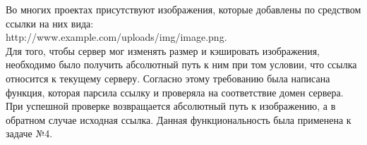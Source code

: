 Во многих проектах присутствуют изображения, которые добавлены по средством ссылки на них вида: \\
http://www.example.com/uploads/img/image.png. \\ Для того, чтобы сервер мог изменять размер и кэшировать изображения, 
необходимо было получить абсолютный путь к ним при том условии, что ссылка относится к текущему серверу. Согласно 
этому требованию была написана функция, которая парсила ссылку и проверяла на соответствие домен сервера. При 
успешной проверке возвращается абсолютный путь к изображению, а в обратном случае исходная ссылка. Данная 
функциональность была применена к задаче №4.
